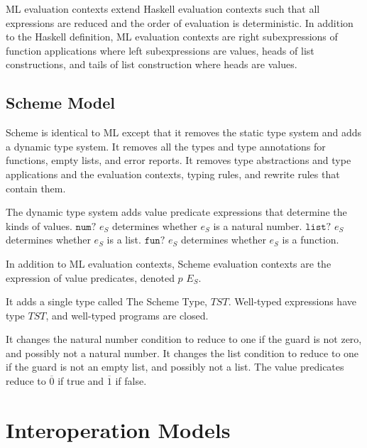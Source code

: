 ML evaluation contexts extend Haskell evaluation contexts such that all expressions are reduced and the order of evaluation is deterministic.  In addition to the Haskell definition, ML evaluation contexts are right subexpressions of function applications where left subexpressions are values, heads of list constructions, and tails of list construction where heads are values.

\subsection{Scheme Model}

Scheme is identical to ML except that it removes the static type system and adds a dynamic type system.  It removes all the types and type annotations for functions, empty lists, and error reports.  It removes type abstractions and type applications and the evaluation contexts, typing rules, and rewrite rules that contain them.

The dynamic type system adds value predicate expressions that determine the kinds of values.  $\mathtt{num?}$ $e_{S}$ determines whether $e_{S}$ is a natural number.  $\mathtt{list?}$ $e_{S}$ determines whether $e_{S}$ is a list.  $\mathtt{fun?}$ $e_{S}$ determines whether $e_{S}$ is a function.

In addition to ML evaluation contexts, Scheme evaluation contexts are the expression of value predicates, denoted $p$ $E_{S}$.

It adds a single type called The Scheme Type, $TST$.  Well-typed expressions have type $TST$, and well-typed programs are closed.

It changes the natural number condition to reduce to one if the guard is not zero, and possibly not a natural number.  It changes the list condition to reduce to one if the guard is not an empty list, and possibly not a list.  The value predicates reduce to $\overline{0}$ if true and $\overline{1}$ if false.










\clearpage

\section{Interoperation Models}

